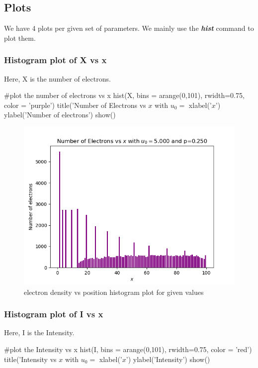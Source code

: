 \documentclass[11pt]{article}
\begin{document}
\subsection{Plots}
We have 4 plots per given set of parameters. We mainly use the \textbf{\textit{hist}} command to plot them.

\subsubsection{Histogram plot of X vs x}
Here, X is the number of electrons.
\begin{python}
#plot the number of electrons vs x
hist(X, bins = arange(0,101), rwidth=0.75, color = 'purple')
title('Number of Electrons vs $x$ with $u_0=$%
xlabel('$x$')
ylabel('Number of electrons')
show()
\end{python}

\begin{figure}[H]
    \centering
    \includegraphics[scale = 1]{1_a.png}
    \caption{electron density vs position histogram plot for given values}
\end{figure}


\subsubsection{Histogram plot of I vs x}
Here, I is the Intensity.
\begin{python}
#plot the Intensity vs x
hist(I, bins = arange(0,101), rwidth=0.75, color = 'red')
title('Intensity vs $x$ with $u_0=$%
xlabel('$x$')
ylabel('Intensity')
show()
\end{python}
\end{document}
